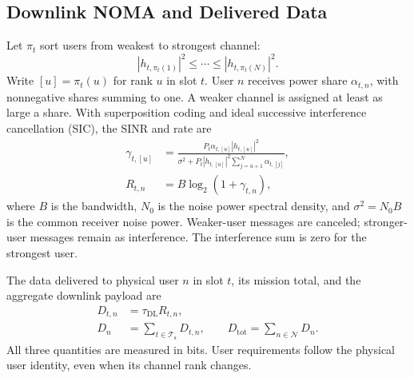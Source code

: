 \documentclass[conference]{IEEEtran}
\newcommand{\DL}{\mathrm{DL}}
\newcommand{\tot}{\mathrm{tot}}
\newcommand{\setT}{\mathcal{T}_{\mathrm{s}}}
\newcommand{\setN}{\mathcal{N}}
\begin{document}
\subsection{Downlink NOMA and Delivered Data}
Let $\pi_t$ sort users from weakest to strongest channel:
\begin{equation}
|h_{t,\pi_t(1)}|^2\le\cdots\le|h_{t,\pi_t(N)}|^2.
\label{eq:sic_order}
\end{equation}
Write $[u]=\pi_t(u)$ for rank $u$ in slot $t$. User $n$ receives power share $\alpha_{t,n}$, with nonnegative shares summing to one. A weaker channel is assigned at least as large a share. With superposition coding and ideal successive interference cancellation (SIC), the SINR and rate are
\begin{align}
\gamma_{t,[u]}&=
\frac{P_t\alpha_{t,[u]}|h_{t,[u]}|^2}
{\sigma^2+P_t|h_{t,[u]}|^2\sum_{j=u+1}^{N}\alpha_{t,[j]}},
\label{eq:sinr}\\
R_{t,n}&=B\log_2(1+\gamma_{t,n}),
\label{eq:rate}
\end{align}
where $B$ is the bandwidth, $N_0$ is the noise power spectral density, and $\sigma^2=N_0B$ is the common receiver noise power. Weaker-user messages are canceled; stronger-user messages remain as interference. The interference sum is zero for the strongest user.

The data delivered to physical user $n$ in slot $t$, its mission total, and the aggregate downlink payload are
\begin{align}
D_{t,n}&=\tau_{\DL}R_{t,n},\label{eq:slot_bits}\\
D_n&=\sum_{t\in\setT}D_{t,n},\qquad
D_{\tot}=\sum_{n\in\setN}D_n.
\label{eq:total_bits}
\end{align}
All three quantities are measured in bits. User requirements follow the physical user identity, even when its channel rank changes.
\end{document}
